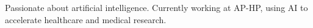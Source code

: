 


\begin{cvparagraph}


Passionate about artificial intelligence. Currently working at AP-HP, using AI to accelerate healthcare and medical research.

\end{cvparagraph}
